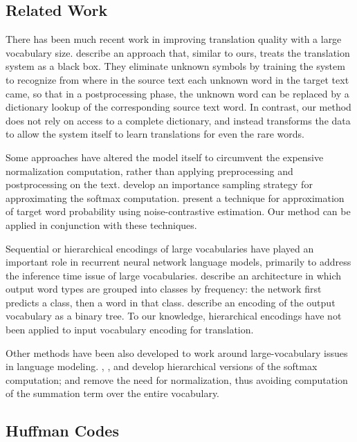 \subsection{Related Work}
There has been much recent work in improving translation quality with a large vocabulary size.
 describe an approach
that, similar to ours, treats the translation system as a black box. They eliminate unknown symbols by training the
system to recognize from where in the source text each unknown word in the target text came, so that in a postprocessing
 phase, the unknown word can be replaced by a dictionary lookup of the corresponding source text word. In contrast,
our method does not rely on access to a complete dictionary, and instead transforms the data to allow the system itself to
learn translations for even the rare words.

Some approaches have altered the model itself to circumvent the expensive normalization computation, rather than
applying preprocessing and postprocessing on the text. 
develop an importance sampling strategy for approximating the softmax computation. 
present a technique for approximation of target word probability using noise-contrastive estimation. Our method can
be applied in conjunction with these techniques.

Sequential or hierarchical encodings of large vocabularies have played an
important role in recurrent neural network language models, primarily to
address the inference time issue of large vocabularies. 
describe an architecture in which output word types are grouped into classes by
frequency: the network first predicts a class, then a word in that
class.  describe an encoding of the output
vocabulary as a binary tree. To our knowledge, hierarchical encodings have not
been applied to input vocabulary encoding for translation.

Other methods have been also developed to work around large-vocabulary issues in
language modeling. , ,
and  develop hierarchical versions of
the softmax computation; 
and  remove the need for normalization,
thus avoiding computation of the summation term over the entire vocabulary.

\subsection{Huffman Codes}

